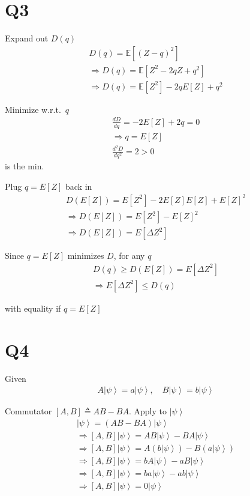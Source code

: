 \documentclass[
]{article}
\providecommand{\ket}[1]{\left\lvert #1 \right\rangle}
\providecommand{\Rarr}{\Rightarrow}
\begin{document}
\section{Q3}

Expand out \(D(q)\)
\begin{gather*}
	D(q)=\mathbb{E}[(Z-q)^2]\\
	\Rarr D(q)=\mathbb{E}[Z^2-2qZ+q^2]\\
	\Rarr D(q)=\mathbb{E}[Z^2]-2qE[Z]+q^2
\end{gather*}

Minimize w.r.t.\ \(q\)
\begin{gather*}
	\tfrac{dD}{dq}=-2E[Z]+2q=0\\
	\Rarr q=E[Z]\\
	\tfrac{d^2D}{dq^2}=2>0
\end{gather*}
is the min.

Plug \(q=E[Z]\) back in
\begin{gather*}
	D(E[Z])=E[Z^2]-2E[Z]E[Z]+E[Z]^2\\
	\Rarr D(E[Z])=E[Z^2]-E[Z]^2\\
	\Rarr D(E[Z])=E[\Delta Z^2]
\end{gather*}

Since \(q=E[Z]\) minimizes \(D\), for any \(q\)
\begin{gather*}
	D(q)\ge D(E[Z])=E[\Delta Z^2]\\
	\Rarr E[\Delta Z^2]\le D(q)
\end{gather*}

with equality if \(q=E[Z]\)

\section{Q4}

Given
\begin{gather*}
	A\ket{\psi}=a\ket{\psi},\quad B\ket{\psi}=b\ket{\psi}
\end{gather*}

Commutator \([A,B]\triangleq AB-BA\). Apply to \(\ket{\psi}\)
\begin{gather*}
	[A,B]\ket{\psi}=(AB-BA)\ket{\psi}\\
	\Rarr [A,B]\ket{\psi}=AB\ket{\psi}-BA\ket{\psi}\\
	\Rarr [A,B]\ket{\psi}=A(b\ket{\psi})-B(a\ket{\psi})\\
	\Rarr [A,B]\ket{\psi}=bA\ket{\psi}-aB\ket{\psi}\\
	\Rarr [A,B]\ket{\psi}=ba\ket{\psi}-ab\ket{\psi}\\
	\Rarr [A,B]\ket{\psi}=0\ket{\psi}
\end{gather*}
\end{document}

